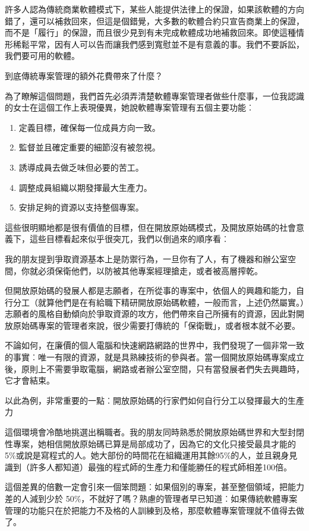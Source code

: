 \documentclass[12pt,]{article}
\makeatletter
\newcommand*{\shifttext}[2]{%
  \settowidth{\@tempdima}{#2}%
  \makebox[\@tempdima]{\hspace*{#1}#2}%
}
\makeatother
\begin{document}
許多人認為傳統商業軟體模式下，某些人能提供法律上的保證，如果該軟體的方向錯了，還可以補救回來，但這是個錯覺，大多數的軟體合約只宣告商業上的保證，而不是「履行」的保證，而且很少見到有未完成軟體成功地補救回來。即使這種情形稀鬆平常，因有人可以告而讓我們感到寬慰並不是有意義的事。我們不要訴訟，我們要可用的軟體。

到底傳統專案管理的額外花費帶來了什麼？

為了瞭解這個問題，我們首先必須弄清楚軟體專案管理者做些什麼事，一位我認識的女士在這個工作上表現優異，她說軟體專案管理有五個主要功能︰

\begin{enumerate}
\item
  定義目標，確保每一位成員方向一致。
\item
  監督並且確定重要的細節沒有被忽視。
\item
  誘導成員去做乏味但必要的苦工。
\item
  調整成員組織以期發揮最大生產力。
\item
  安排足夠的資源以支持整個專案。
\end{enumerate}

這些很明顯地都是很有價值的目標，但在開放原始碼模式，及開放原始碼的社會意義下，這些目標看起來似乎很突兀，我們以倒過來的順序看︰

我的朋友提到爭取資源基本上是防禦行為，一旦你有了人，有了機器和辦公室空間，你就必須保衛他們，以防被其他專案經理搶走，或者被高層搾乾。

但開放原始碼的發展人都是志願者，在所從事的專案中，依個人的興趣和能力，自行分工（就算他們是在有給職下精研開放原始碼軟體，一般而言，上述仍然屬實。）志願者的風格自動傾向於爭取資源的攻方，他們帶來自己所擁有的資源，因此對開放原始碼專案的管理者來說，很少需要打傳統的「保衛戰」，或者根本就不必要。

不論如何，在廉價的個人電腦和快速網路網路的世界中，我們發現了一個非常一致的事實︰唯一有限的資源，就是具熟練技術的參與者。當一個開放原始碼專案成立後，原則上不需要爭取電腦，網路或者辦公室空間，只有當發展者們失去興趣時，它才會結束。

以此為例，非常重要的一點︰開放原始碼的行家們如何自行分工以發揮最大的生產力
\shifttext{1pt}{---}\shifttext{-1pt}{---}
這個環境會冷酷地挑選出稱職者。我的朋友同時熟悉於開放原始碼世界和大型封閉性專案，她相信開放原始碼已算是局部成功了，因為它的文化只接受最具才能的5\%或說是寫程式的人。她大部份的時間花在組織運用其餘95\%的人，並且親身見識到（許多人都知道）最強的程式師的生產力和僅能勝任的程式師相差100倍。

這個差異的倍數一定會引來一個笨問題︰如果個別的專案，甚至整個領域，把能力差的人減到少於
50\%，不就好了嗎？熟慮的管理者早已知道︰如果傳統軟體專案管理的功能只在於把能力不及格的人訓練到及格，那麼軟體專案管理就不值得去做了。
\end{document}

